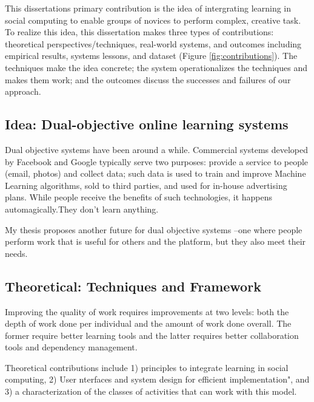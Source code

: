 This dissertation\textquotesingle s primary contribution is the idea of intergrating learning in social computing to enable groups of novices to perform complex, creative task. To realize this idea, this dissertation makes three types of contributions: theoretical perspectives/techniques, real-world systems, and outcomes including empirical results, systems lessons, and dataset (Figure \ref{fig:contributions}). The techniques make the idea concrete; the system operationalizes the techniques and makes them work; and the outcomes discuss the successes and failures of our approach.



\subsection{Idea: Dual-objective online learning systems}
Dual objective systems have been around  a while. Commercial systems developed by Facebook and Google typically serve two purposes: provide a service to people (email, photos) and collect data; such data is used to train and improve Machine Learning algorithms, sold to third parties, and used for in-house advertising plans. While people receive the benefits of such technologies, it happens automagically.They don\textquotesingle 't learn anything.

My thesis proposes another future for dual objective systems --one where people perform work that is useful for others and the platform, but they also meet their needs. 

\subsection{Theoretical: Techniques and Framework}
Improving the quality of work requires improvements at two levels: both the depth of work done per individual and the amount of work done overall. The former require better learning tools and the latter requires better collaboration tools and dependency management. 

Theoretical contributions include 1) principles to integrate learning in social computing, 2) User nterfaces and system design for efficient implementation", and 3) a characterization of the classes of activities that can work with this model.

